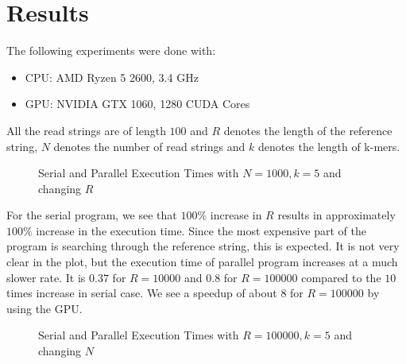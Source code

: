 \documentclass{article}
\begin{document}
\section{Results}

The following experiments were done with: 
\begin{itemize}
    \item CPU: AMD Ryzen 5 2600, 3.4 GHz
    \item GPU: NVIDIA GTX 1060, 1280 CUDA Cores
\end{itemize}

All the read strings are of length $100$ and $R$ denotes the length of the reference string, $N$ denotes the number of read strings and $k$ denotes the length of k-mers.

\begin{center}
\begin{figure}[H]
\caption{Serial and Parallel Execution Times with $N=1000, k=5$ and changing $R$}
\end{figure}
\end{center}

For the serial program, we see that $100\%$ increase in $R$ results in approximately $100\%$ increase in the execution time. Since the most expensive part of the program is searching through the reference string, this is expected. It is not very clear in the plot, but the execution time of parallel program increases at a much slower rate. It is $0.37$ for $R=10000$ and $0.8$ for $R=100000$ compared to the $10$ times increase in serial case. We see a speedup of about $8$ for $R=100000$ by using the GPU.

\begin{center}
\begin{figure}[H]
\caption{Serial and Parallel Execution Times with $R=100000, k=5$ and changing $N$}
\end{figure}
\end{center}
\end{document}
